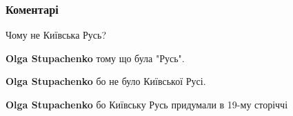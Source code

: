  
 
 
 
 
\subsubsection{Коментарі}
\label{sec:06_09_2021.fb.pekar_valerij.1.rusj_moskovia.cmt}

\begin{itemize}
 
Чому не Київська Русь?

\begin{itemize}
 
\textbf{Olga Stupachenko} тому що була "Русь".

 
\textbf{Olga Stupachenko} бо не було Київської Русі.

 
\textbf{Olga Stupachenko} бо Київську Русь придумали в 19-му сторіччі

 

\end{itemize}
\end{itemize}

